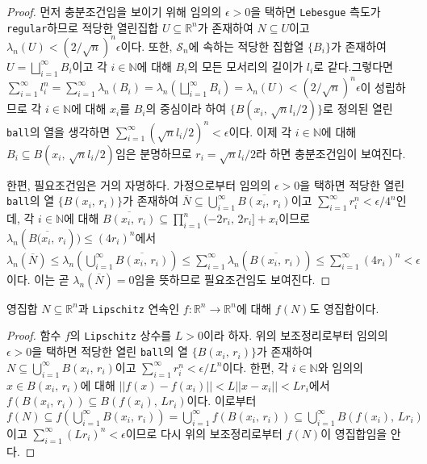 \begin{proof}
    먼저 충분조건임을 보이기 위해 임의의 $\epsilon>0$을 택하면 \texttt{Lebesgue} 측도가 \texttt{regular}하므로 적당한 열린집합 $U\subseteq\mathbb{R}^n$가 존재하여 $N\subseteq U$이고 $\lambda_n(U)<(2/\sqrt{n})^n\epsilon$이다. 또한, $\mathcal{S}_n$에 속하는 적당한 집합열 $\{B_i\}$가 존재하여 $U=\bigsqcup_{i=1}^\infty B_i$이고 각 $i\in\mathbb{N}$에 대해 $B_i$의 모든 모서리의 길이가 $l_i$로 같다.\footnotemark 그렇다면 $\sum_{i=1}^\infty l_i^n=\sum_{i=1}^\infty\lambda_n(B_i)=\lambda_n(\bigsqcup_{i=1}^\infty B_i)=\lambda_n(U)<(2/\sqrt{n})^n\epsilon$이 성립하므로 각 $i\in\mathbb{N}$에 대해 $x_i$를 $B_i$의 중심이라 하여 $\{B(x_i,\,\sqrt{n}l_i/2)\}$로 정의된 열린 \texttt{ball}의 열을 생각하면 $\sum_{i=1}^\infty(\sqrt{n}l_i/2)^n<\epsilon$이다. 이제 각 $i\in\mathbb{N}$에 대해 $B_i\subseteq B(x_i,\,\sqrt{n}l_i/2)$임은 분명하므로 $r_i=\sqrt{n}l_i/2$라 하면 충분조건임이 보여진다.
    
    한편, 필요조건임은 거의 자명하다. 가정으로부터 임의의 $\epsilon>0$을 택하면 적당한 열린 \texttt{ball}의 열 $\{B(x_i,\,r_i)\}$가 존재하여 $\overline{N}\subseteq\bigcup_{i=1}^\infty\overline{B(x_i,\,r_i)}$이고 $\sum_{i=1}^\infty r_i^n<\epsilon/4^n$인데, 각 $i\in\mathbb{N}$에 대해 $\overline{B(x_i,\,r_i)}\subseteq\prod_{i=1}^n(-2r_i,\,2r_i]+x_i$이므로 $\lambda_n(\overline{B(x_i,\,r_i}))\leq(4r_i)^n$에서 $\lambda_n(\overline{N})\leq\lambda_n(\bigcup_{i=1}^\infty\overline{B(x_i,\,r_i)})\leq\sum_{i=1}^\infty\lambda_n(\overline{B(x_i,\,r_i)})\leq\sum_{i=1}^\infty (4r_i)^n<\epsilon$이다. 이는 곧 $\lambda_n(\overline{N})=0$임을 뜻하므로 필요조건임도 보여진다.
\end{proof}

\begin{lemma}\label{lem:LipschitzNull}
    영집합 $N\subseteq\mathbb{R}^n$과 \texttt{Lipschitz} 연속인 $f:\mathbb{R}^n\to\mathbb{R}^n$에 대해 $f(N)$도 영집합이다.
\end{lemma}

\begin{proof}
    함수 $f$의 \texttt{Lipschitz} 상수를 $L>0$이라 하자. 위의 보조정리로부터 임의의 $\epsilon>0$을 택하면 적당한 열린 \texttt{ball}의 열 $\{B(x_i,\,r_i)\}$가 존재하여 $N\subseteq\bigcup_{i=1}^\infty B(x_i,\,r_i)$이고 $\sum_{i=1}^\infty r_i^n<\epsilon/L^n$이다. 한편, 각 $i\in\mathbb{N}$와 임의의 $x\in B(x_i,\,r_i)$에 대해 $||f(x)-f(x_i)||<L||x-x_i||<Lr_i$에서 $f(B(x_i,\,r_i))\subseteq B(f(x_i),\,Lr_i)$이다. 이로부터 $f(N)\subseteq f(\bigcup_{i=1}^\infty B(x_i,\,r_i))=\bigcup_{i=1}^\infty f(B(x_i,\,r_i))\subseteq\bigcup_{i=1}^\infty B(f(x_i),\,Lr_i)$이고 $\sum_{i=1}^\infty(Lr_i)^n<\epsilon$이므로 다시 위의 보조정리로부터 $f(N)$이 영집합임을 안다.
\end{proof}

